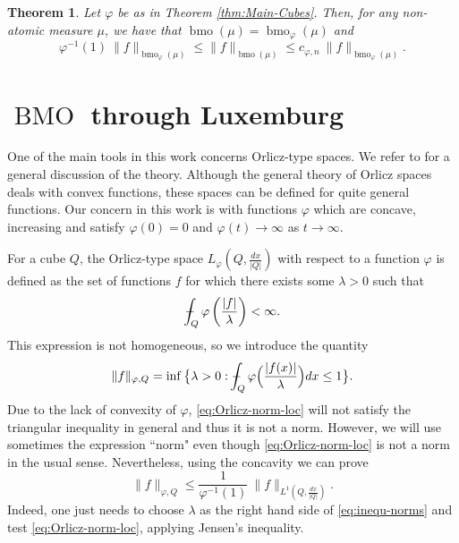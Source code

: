 \documentclass[11pt,a4paper]{amsart}
\newtheorem{theorem}{Theorem}[section]
\theoremstyle{definition}
\theoremstyle{remark}
\numberwithin{equation}{section}
\DeclareMathOperator{\BMO}{BMO}
\DeclareMathOperator{\bmo}{bmo}
\def\Xint#1{\mathchoice
  {\XXint\displaystyle\textstyle{#1}}%
  {\XXint\textstyle\scriptstyle{#1}}%
  {\XXint\scriptstyle\scriptscriptstyle{#1}}%
  {\XXint\scriptscriptstyle\scriptscriptstyle{#1}}%
  \!\int}
\def\XXint#1#2#3{{\setbox0=\hbox{$#1{#2#3}{\int}$}
    \vcenter{\hbox{$#2#3$}}\kern-.5\wd0}}
\def\avgint{\Xint-}
\numberwithin{equation}{section}
\begin{document}
\begin{theorem}\label{thm:rectangles-non-doubling}
Let $\varphi$ be as in Theorem \ref{thm:Main-Cubes}. Then, for any non-atomic measure $\mu$, we have that  $\bmo(\mu)= \bmo_\varphi(\mu)$ and 
%
\begin{equation*}
\varphi^{-1}(1) \: \|f\|_{\bmo_\varphi(\mu)} \leq \|f\|_{\bmo(\mu)} \leq c_{\varphi,n} \: \|f\|_{\bmo_\varphi(\mu)}.
\end{equation*}
%
\end{theorem}









\section{\texorpdfstring{$\BMO$}{BMO} through Luxemburg}\label{sec:BMO-luxemburg} 

One of the main tools in this work concerns Orlicz-type spaces. We refer to \cite{Wilson-LNM} for a general discussion of the theory.  Although the general theory of Orlicz spaces deals with convex functions, these spaces can be defined for quite general functions. Our concern in this work is with functions $\varphi$ which are concave, increasing and satisfy $\varphi(0)=0$ and $\varphi(t) \rightarrow\infty$ as $t \rightarrow \infty$. 

For a cube $Q$, the Orlicz-type space $L_\varphi(Q,\frac{dx}{|Q|})$ with respect to a function $\varphi$ is defined as the set of functions $f$ for which there exists some $\lambda>0$ such that 
%
\[
\avgint_Q \varphi\left (\frac{|f|}{\lambda}\right ) <\infty.
\]
%
This expression is not homogeneous, so we introduce the quantity
%
\begin{equation}\label{eq:Orlicz-norm-loc}
\|f\|_{\varphi,Q} = \inf \big\lbrace \lambda>0: \avgint_Q \varphi\Big( \frac{|f(x)|}{\lambda}\Big) dx \leq 1\big\rbrace.
\end{equation}
%
Due to the lack of convexity of $\varphi$, \eqref{eq:Orlicz-norm-loc} will not satisfy the triangular inequality in general and thus it is not a norm. However, we will use sometimes the expression ``norm" even though \eqref{eq:Orlicz-norm-loc} is not a norm in the usual sense. Nevertheless, using the concavity we can prove
%
\begin{equation}\label{eq:inequ-norms}
\|f\|_{\varphi,Q} \leq \frac{1}{ \varphi^{-1}(1)} \: \|f\|_{L^1(Q,\frac{dx}{|Q|})}.
\end{equation}
%
Indeed, one just needs to choose $\lambda$ as the right hand side of \eqref{eq:inequ-norms} and test \eqref{eq:Orlicz-norm-loc}, applying Jensen's inequality.
\end{document}
